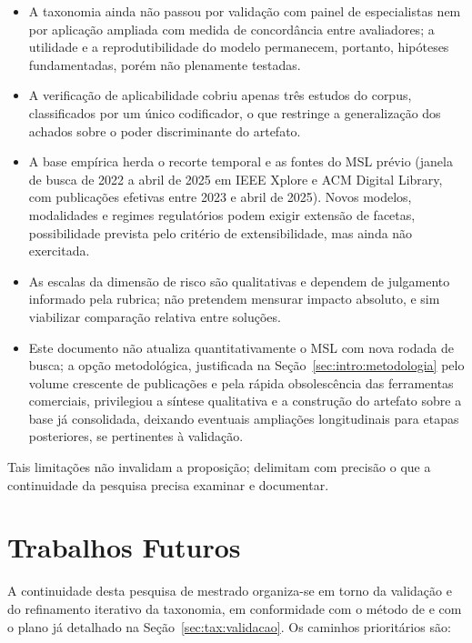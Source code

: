 \begin{itemize}
    \item A taxonomia ainda não passou por validação com painel de especialistas nem por aplicação ampliada com medida de concordância entre avaliadores; a utilidade e a reprodutibilidade do modelo permanecem, portanto, hipóteses fundamentadas, porém não plenamente testadas.

    \item A verificação de aplicabilidade cobriu apenas três estudos do corpus, classificados por um único codificador, o que restringe a generalização dos achados sobre o poder discriminante do artefato.

    \item A base empírica herda o recorte temporal e as fontes do MSL prévio (janela de busca de 2022 a abril de 2025 em IEEE Xplore e ACM Digital Library, com publicações efetivas entre 2023 e abril de 2025). Novos modelos, modalidades e regimes regulatórios podem exigir extensão de facetas, possibilidade prevista pelo critério de extensibilidade, mas ainda não exercitada.

    \item As escalas da dimensão de risco são qualitativas e dependem de julgamento informado pela rubrica; não pretendem mensurar impacto absoluto, e sim viabilizar comparação relativa entre soluções.

    \item Este documento não atualiza quantitativamente o MSL com nova rodada de busca; a opção metodológica, justificada na Seção~\ref{sec:intro:metodologia} pelo volume crescente de publicações e pela rápida obsolescência das ferramentas comerciais, privilegiou a síntese qualitativa e a construção do artefato sobre a base já consolidada, deixando eventuais ampliações longitudinais para etapas posteriores, se pertinentes à validação.
\end{itemize}

Tais limitações não invalidam a proposição; delimitam com precisão o que a continuidade da pesquisa precisa examinar e documentar.

\section{Trabalhos Futuros}

A continuidade desta pesquisa de mestrado organiza-se em torno da validação e do refinamento iterativo da taxonomia, em conformidade com o método de \citet{nickerson2013method} e com o plano já detalhado na Seção~\ref{sec:tax:validacao}. Os caminhos prioritários são:

